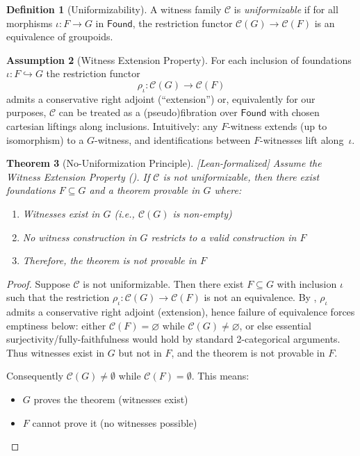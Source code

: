 \documentclass[11pt]{article}
\theoremstyle{plain}
\newtheorem{theorem}{Theorem}[section]
\theoremstyle{definition}
\newtheorem{definition}[theorem]{Definition}
\newtheorem{assumption}[theorem]{Assumption}
\newcommand{\Found}{\mathsf{Found}}
\newcommand{\leanok}{\textsf{\textcolor{green!70!black}{[Lean-formalized]}}}
\begin{document}
\begin{definition}[Uniformizability]\label{def:uniformizable}
A witness family $\mathcal{C}$ is \emph{uniformizable} if for all morphisms $\iota: F \to G$ in $\Found$, the restriction functor $\mathcal{C}(G) \to \mathcal{C}(F)$ is an equivalence of groupoids.
\end{definition}

\begin{assumption}[Witness Extension Property]\label{assump:WEP}
For each inclusion of foundations $\iota:F\hookrightarrow G$ the restriction functor
\[
  \rho_{\iota}:\mathcal C(G)\longrightarrow \mathcal C(F)
\]
admits a conservative right adjoint (``extension'') or, equivalently for our purposes, $\mathcal C$ can be treated as a (pseudo)fibration over $\Found$ with chosen cartesian liftings along inclusions. Intuitively: any $F$-witness extends (up to isomorphism) to a $G$-witness, and identifications between $F$-witnesses lift along~$\iota$.
\end{assumption}

\begin{theorem}[No-Uniformization Principle]\label{thm:no-unif} \leanok
Assume the Witness Extension Property (). 
If $\mathcal{C}$ is not uniformizable, then there exist foundations $F \subseteq G$ and a theorem provable in $G$ where:
\begin{enumerate}
\item Witnesses exist in $G$ (i.e., $\mathcal{C}(G)$ is non-empty)
\item No witness construction in $G$ restricts to a valid construction in $F$
\item Therefore, the theorem is not provable in $F$
\end{enumerate}
\end{theorem}

\begin{proof}
Suppose $\mathcal{C}$ is not uniformizable. Then there exist $F \subseteq G$ with inclusion $\iota$ such that the restriction $\rho_\iota:\mathcal{C}(G) \to \mathcal{C}(F)$ is not an equivalence. By , $\rho_\iota$ admits a conservative right adjoint (extension), hence failure of equivalence forces emptiness below: either $\mathcal{C}(F)=\varnothing$ while $\mathcal{C}(G)\neq\varnothing$, or else essential surjectivity/fully-faithfulness would hold by standard 2-categorical arguments. Thus witnesses exist in $G$ but not in $F$, and the theorem is not provable in $F$.

Consequently $\mathcal{C}(G) \neq \emptyset$ while $\mathcal{C}(F) = \emptyset$. This means:
\begin{itemize}
\item $G$ proves the theorem (witnesses exist)
\item $F$ cannot prove it (no witnesses possible)
\end{itemize}
\end{proof}
\end{document}
